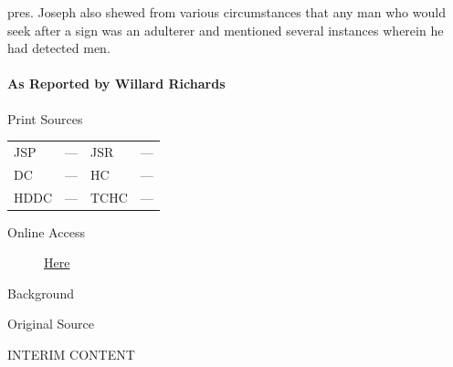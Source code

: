 					pres. Joseph also shewed from various circumstances that any man who would seek after a sign was an adulterer and mentioned several instances wherein he had detected men.
					
			\paragraph{As Reported by Willard Richards}
				\label{EMS-1843-JS-9-FEB-1843-WR}
			
				\begin{description}
					\item[Print Sources]
				\end{description}

					\begin{tabular}{p{0.5in}p{1in}p{0.5in}p{1in}}
					JSP	 	& ---		& JSR 		& --- \\
					DC	 	& ---		& HC 		& --- \\
					HDDC 	& ---		& TCHC 		& --- \\
					\end{tabular}
				
				\begin{description}
					\item[Online Access] \href{https://www.josephsmithpapers.org/paper-summary/instruction-9-february-1843-dc-129-as-reported-by-willard-richards/1}{Here}
				\end{description}
				
				\begin{description}
					\item[Background]
				\end{description}
				
				
				\begin{description}
					\item[Original Source]
				\end{description}
				
					INTERIM CONTENT
				
				
